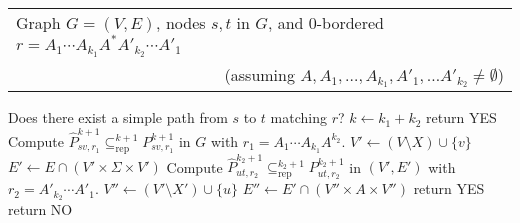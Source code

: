 \documentclass[a4paper,english]{lipics-v2016}
\theoremstyle{plain}
\begin{document}
\begin{algorithm}[t]{}
\caption{}
\begin{algorithmic}[1]
  \Require 
  \begin{tabular}[t]{l}
    Graph $G=(V,E)$, nodes $s,t$ in $G$, and 0-bordered $r= A_1 \cdots
    A_{k_1} A^* A'_{k_2} \cdots A'_1$\\
    \multicolumn{1}{r}{(assuming $A, A_{1},\ldots, A_{k_1}, A'_1,\ldots A'_{k_2} \neq \emptyset$)}
  \end{tabular}
  \Ensure Does there exist a simple path from $s$ to $t$ matching $r$?
\State $k \gets k_1 + k_2$ 
\State return YES
\EndIf
{}
\State Compute $\hat{P}^{k+1}_{sv,r_1} \subseteq^{k+1}_\text{rep} P^{k+1}_{sv,r_1}$ in $G$ with  $r_1= A_1 \cdots A_{k_1} A^{k_2} $.  \label{alg:block5} 
\State $V' \gets (V \setminus X) \cup \{v\}$
\State $E' \gets E \cap (V' \times \Sigma \times V')$\label{alg:blockRevEdges} \label{alg:block12}
\State Compute $\hat{P}^{k_2+1}_{ut,r_2} \subseteq^{k_2+1}_\text{rep} P^{k_2+1}_{ut,r_2}$ in $(V',E')$ with  $r_2= A'_{k_2} \cdots A'_{1}$. \label{alg:block13}
\State $V'' \gets (V' \setminus X') \cup \{u\}$
\State $E'' \gets E' \cap (V'' \times A \times V'')$ 
\State return YES
\EndIf 
\EndFor
\EndFor \label{alg:block22}
\EndFor
\EndFor \label{alg:block:lastfor}
\State return NO
\end{algorithmic}
\label{alg:block}
\end{algorithm}
\end{document}
